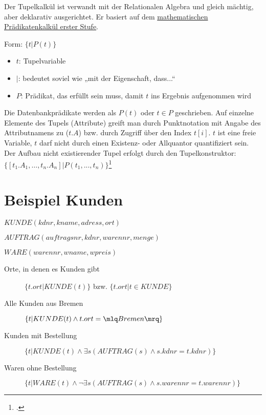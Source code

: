\documentclass{lehramt-informatik-haupt}
\begin{document}
Der Tupelkalkül ist verwandt mit der Relationalen Algebra und gleich
mächtig, aber deklarativ ausgerichtet. Er basiert auf dem
\href{https://de.wikipedia.org/wiki/Prädikatenlogik_erster_Stufe}
{mathematischen Prädikatenkalkül erster Stufe}.

\begin{center}
Form: $\{t | P(t)\}$
\end{center}

\begin{itemize}
\item $t$: Tupelvariable

\item $|$: bedeutet soviel wie „mit der Eigenschaft, dass...“

\item $P$: Prädikat, das erfüllt sein muss, damit $t$ ins Ergebnis
aufgenommen wird
\end{itemize}

Die Datenbankprädikate werden als $P(t)$ oder $t \in P$ geschrieben. Auf
einzelne Elemente des Tupels (Attribute) greift man durch Punktnotation
mit Angabe des Attributnamens zu ($t.A$) bzw. durch Zugriff über den
Index $t[i]$.
%
$t$ ist eine freie Variable, \dh $t$ darf nicht durch einen Existenz- oder
Allquantor quantifiziert sein.
%
Der Aufbau nicht existierender Tupel erfolgt durch den Tupelkonstruktor:
$\{[t_1.A_1,\dots,t_n.A_n] | P(t_1,...,t_n)\}$\footcite[Seite 24-25]{db:fs:3}

%

\section{Beispiel Kunden}

\begin{mdframed}
\noindent
$KUNDE (kdnr, kname, adress, ort)$

\noindent
$AUFTRAG (auftragsnr, kdnr, warennr, menge)$

\noindent
$WARE (warennr, wname, wpreis)$
\end{mdframed}

\begin{description}
\item[Orte, in denen es Kunden gibt]
$\{t.ort | KUNDE(t)\}$ bzw. $\{t.ort | t \in KUNDE \}$

\item[Alle Kunden aus Bremen]
$\{t | KUNDE(t) \land t.ort=\mlq Bremen \mrq \}$

\item[Kunden mit Bestellung]
$\{t | KUNDE(t) \land \exists s(AUFTRAG(s) \land s.kdnr=t.kdnr)\}$

\item[Waren ohne Bestellung]
$\{t | WARE(t) \land \neg\exists s(AUFTRAG(s) \land s.warennr=t.warennr)\}$
\end{description}
\end{document}
